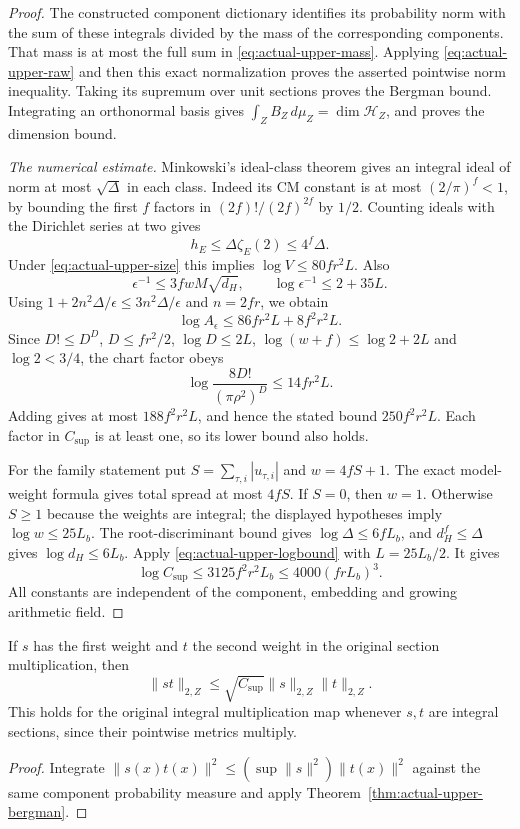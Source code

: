 \begin{proof}
The constructed component dictionary identifies its probability
norm with the sum of these integrals divided by the mass of the
corresponding components.  That mass is at most the full sum in
\eqref{eq:actual-upper-mass}.  Applying
\eqref{eq:actual-upper-raw} and then this exact normalization proves
the asserted pointwise norm inequality.  Taking its supremum over
unit sections proves the Bergman bound.  Integrating an orthonormal
basis gives $\int_Z B_Z\,d\mu_Z=\dim\mathcal H_Z$, and proves the
dimension bound.

\emph{The numerical estimate.}
Minkowski's ideal-class theorem gives an integral ideal of norm
at most $\sqrt\Delta$ in each class.  Indeed its CM constant is
at most $(2/\pi)^f<1$, by bounding the first $f$ factors in
$(2f)!/(2f)^{2f}$ by $1/2$.  Counting ideals with the Dirichlet
series at two gives
\[
                 h_E\le\Delta\zeta_E(2)
                        \le4^f\Delta.
\]
Under \eqref{eq:actual-upper-size} this implies
$\log V\le80fr^2L$.
Also
\[
       \epsilon^{-1}\le3fwM\sqrt{d_H},\qquad
       \log\epsilon^{-1}\le2+35L.
\]
Using $1+2n^2\Delta/\epsilon\le3n^2\Delta/\epsilon$
and $n=2fr$, we obtain
\[
          \log A_\epsilon
                  \le86fr^2L+8f^2r^2L.
\]
Since $D!\le D^D$, $D\le fr^2/2$, $\log D\le2L$,
$\log(w+f)\le\log2+2L$ and $\log2<3/4$, the chart factor obeys
\[
        \log\frac{8D!}{(\pi\rho^2)^D}\le14fr^2L.
\]
Adding gives at most $188f^2r^2L$, and hence the stated bound
$250f^2r^2L$.  Each factor in $C_{\mathrm{sup}}$ is at least
one, so its lower bound also holds.

For the family statement put $S=\sum_{\tau,i}|u_{\tau,i}|$ and
$w=4fS+1$.  The exact model-weight formula gives total spread at
most $4fS$.  If $S=0$, then $w=1$.  Otherwise $S\ge1$ because
the weights are integral; the displayed hypotheses imply
$\log w\le25L_b$.  The root-discriminant bound gives
$\log\Delta\le6fL_b$, and $d_H^f\le\Delta$ gives
$\log d_H\le6L_b$.  Apply
\eqref{eq:actual-upper-logbound} with $L=25L_b/2$.
It gives
\[
      \log C_{\mathrm{sup}}\le3125f^2r^2L_b
                                 \le4000(frL_b)^3.
\]
All constants are independent of the component, embedding and
growing arithmetic field.
\end{proof}

\begin{corollary}
\label{cor:actual-upper-multiplication}
If $s$ has the first weight and $t$ the second weight in the
original section multiplication, then
\[
       \|st\|_{2,Z}\le\sqrt{C_{\mathrm{sup}}}
                              \|s\|_{2,Z}\|t\|_{2,Z}.
\]
This holds for the original integral multiplication map whenever
$s,t$ are integral sections, since their pointwise metrics multiply.
\end{corollary}
\begin{proof}
Integrate $\|s(x)t(x)\|^2\le
(\sup\|s\|^2)\|t(x)\|^2$ against the same component probability
measure and apply Theorem~\ref{thm:actual-upper-bergman}.
\end{proof}

